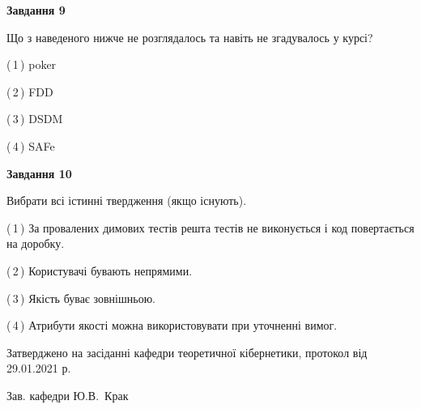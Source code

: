 \documentclass[10pt, ukrainian]{article}
\begin{document}
{\begin {large}
{\begin {center}\textbf{Завдання 9}\end {center}}\par
Що з наведеного нижче не розглядалось та навіть не згадувалось у курсі?\par
\vspace{2mm}



(\,1\,) poker%



(\,2\,) FDD%



(\,3\,) DSDM%



(\,4\,) SAFe%


{\begin {center}\textbf{Завдання 10}\end {center}}\par
Вибрати всі істинні твердження (якщо існують).\par
\vspace{2mm}



(\,1\,) За провалених димових тестів решта тестів не виконується і код повертається на доробку.%



(\,2\,) Користувачі бувають непрямими.%



(\,3\,) Якість буває зовнішньою.%



(\,4\,) Атрибути якості можна використовувати при уточненні вимог.%



\end {large}}
{\vspace{5mm}\smallskip \begin {small} Затверджено на засіданні кафедри теоретичної кібернетики, протокол  від   29.01.2021 р.\par\smallskip\smallskip
{\parbox {6.5 cm}{Зав. кафедри \dotfill Ю.В.~Крак}} \end{small}}
\newpage
\end{document}
